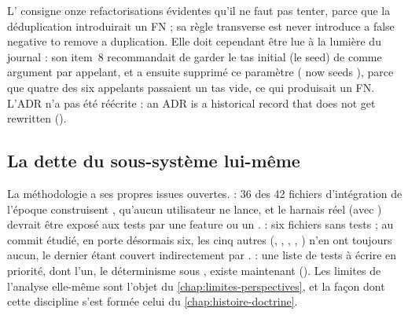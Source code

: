 \begin{decision}
L' consigne onze refactorisations \og évidentes\fg{} qu'il ne faut pas tenter, parce que la déduplication introduirait un FN ; sa règle transverse est \og never introduce a false negative to remove a duplication\fg{}. Elle doit cependant être lue à la lumière du journal : son item~8 recommandait de garder le tas initial (le seed) de  comme argument par appelant, et  a ensuite supprimé ce paramètre (\og {} now seeds \fg{}), parce que quatre des six appelants passaient un tas vide, ce qui produisait un FN. L'ADR n'a pas été réécrite : \og an ADR is a historical record that does not get rewritten\fg{} ().
\end{decision}

\subsection{La dette du sous-système lui-même}

La méthodologie a ses propres issues  ouvertes.  : 36 des 42 fichiers d'intégration de l'époque construisent , qu'aucun utilisateur ne lance, et le harnais réel (avec ) devrait être exposé aux tests par une feature ou un .  : six fichiers sans tests ; au commit étudié,  en porte désormais six, les cinq autres (, , , , ) n'en ont toujours aucun, le dernier étant couvert indirectement par .  : une liste de tests à écrire en priorité, dont l'un, le déterminisme sous , existe maintenant (). Les limites de l'analyse elle-même sont l'objet du \cref{chap:limites-perspectives}, et la façon dont cette discipline s'est formée celui du \cref{chap:histoire-doctrine}.


